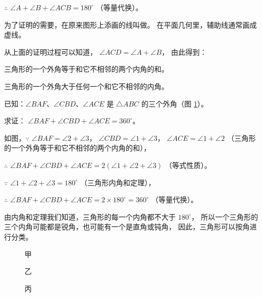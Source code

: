 $\therefore$ \quad $\angle A + \angle B + \angle ACB = 180^\circ$ （等量代换）。

为了证明的需要，在原来图形上添画的线叫做。
在平面几何里，辅助线通常画成虚线。

从上面的证明过程可以知道， $\angle ACD = \angle A + \angle B$， 由此得到：

\begin{tuilun}[推论1]
    三角形的一个外角等于和它不相邻的两个内角的和。
\end{tuilun}

\begin{tuilun}[推论2]
    三角形的一个外角大于任何一个和它不相邻的内角。
\end{tuilun}


\begin{figure}
    \centering
    
    \caption{}\label{fig:czjh1-3-12}
\end{figure}

\liti[0] 已知：$\angle BAF$、$\angle CBD$、$\angle ACE$ 是 $\triangle ABC$ 的三个外角（图 \ref{fig:czjh1-3-12}）。

求证： $\angle BAF + \angle CBD + \angle ACE = 360^\circ$。

\zhengming 如图，$\because$ \quad $\angle BAF = \angle 2 + \angle 3$，
$\angle CBD = \angle 1 + \angle 3$， $\angle ACE = \angle 1 + \angle 2$
（三角形的一个外角等于和它不相邻的两个内角的和），

$\therefore$ \quad $\angle BAF + \angle CBD + \angle ACE = 2(\angle 1 + \angle 2 + \angle 3)$ （等式性质）。

$\because$ \quad $\angle 1 + \angle 2 + \angle 3 = 180^\circ$ （三角形内角和定理），

$\therefore$ \quad $\angle BAF + \angle CBD + \angle ACE = 2 \times 180^\circ = 360^\circ$ （等量代换）。

由内角和定理我们知道，三角形的每一个内角都不大于 $180^\circ$，
所以一个三角形的三个内角可能都是锐角，也可能有一个是直角或钝角，
因此，三角形可以按角进行分类。

\begin{figure}[htbp]
    \centering
    \begin{minipage}[b]{4.5cm}
        \centering
        
        \caption*{甲}
    \end{minipage}
    \qquad
    \begin{minipage}[b]{4cm}
        \centering
        
        \caption*{乙}
    \end{minipage}
    \begin{minipage}[b]{4cm}
        \centering
        
        \caption*{丙}
    \end{minipage}
    \caption{}\label{fig:czjh1-3-13}
\end{figure}


